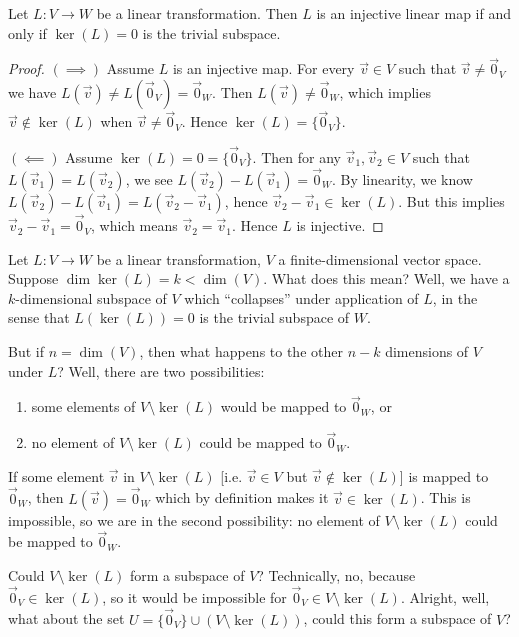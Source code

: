 \begin{theorem}
  Let $L\colon V\to W$ be a linear transformation.
  Then $L$ is an injective linear map if and only if $\ker(L)=0$ is the trivial subspace.
\end{theorem}
\begin{proof}
$(\implies)$ Assume $L$ is an injective map. For every $\vec{v}\in V$
  such that $\vec{v}\neq\vec{0}_{V}$ we have $L(\vec{v})\neq L(\vec{0}_{V})=\vec{0}_{W}$.
  Then $L(\vec{v})\neq\vec{0}_{W}$, which implies $\vec{v}\notin\ker(L)$
  when $\vec{v}\neq\vec{0}_{V}$. Hence $\ker(L)=\{\vec{0}_{V}\}$.

$(\impliedby)$ Assume $\ker(L)=0=\{\vec{0}_{V}\}$.
  Then for any $\vec{v}_{1},\vec{v}_{2}\in V$ such that
  $L(\vec{v}_{1})=L(\vec{v}_{2})$, we see $L(\vec{v}_{2})-L(\vec{v}_{1})=\vec{0}_{W}$.
  By linearity, we know $L(\vec{v}_{2})-L(\vec{v}_{1})=L(\vec{v}_{2}-\vec{v}_{1})$,
  hence $\vec{v}_{2}-\vec{v}_{1}\in\ker(L)$. But this implies $\vec{v}_{2}-\vec{v}_{1}=\vec{0}_{V}$,
  which means $\vec{v}_{2}=\vec{v}_{1}$. Hence $L$ is injective.
\end{proof}

Let $L\colon V\to W$ be a linear transformation, $V$ a
finite-dimensional vector space. Suppose $\dim\ker(L)=k<\dim(V)$.
What does this mean? Well, we have a $k$-dimensional subspace of $V$
which ``collapses'' under application of $L$, in the sense that
$L(\ker(L))=0$ is the trivial subspace of $W$.

But if $n=\dim(V)$, then what happens to the other $n-k$ dimensions of
$V$ under $L$? Well, there are two possibilities:
\begin{enumerate}
\item some elements of $V\setminus\ker(L)$ would be mapped to
  $\vec{0}_{W}$, or
\item no element of $V\setminus\ker(L)$ could be mapped to $\vec{0}_{W}$.
\end{enumerate}
If some element $\vec{v}$ in $V\setminus\ker(L)$ [i.e. $\vec{v}\in V$
  but $\vec{v}\notin\ker(L)$] is mapped to $\vec{0}_{W}$, then
$L(\vec{v})=\vec{0}_{W}$ which by definition makes it
$\vec{v}\in\ker(L)$. This is impossible, so we are in the second
possibility: no element of $V\setminus\ker(L)$ could be mapped to
$\vec{0}_{W}$.

Could $V\setminus\ker(L)$ form a subspace of $V$?
Technically, no, because $\vec{0}_{V}\in\ker(L)$, so it would be
impossible for $\vec{0}_{V}\in V\setminus\ker(L)$. Alright, well, what
about the set $U=\{\vec{0}_{V}\}\cup(V\setminus\ker(L))$, could this
form a subspace of $V$?

